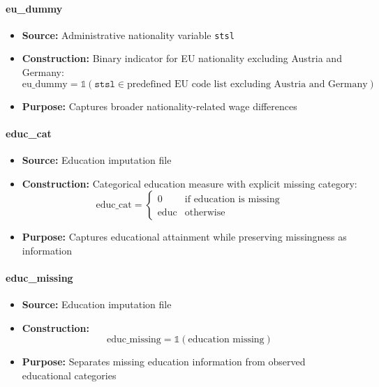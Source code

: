 \documentclass{article}
\begin{document}
\paragraph{eu\_dummy}
\begin{itemize}
    \item \textbf{Source:} Administrative nationality variable \texttt{stsl}
    \item \textbf{Construction:} Binary indicator for EU nationality excluding Austria and Germany:
    \begin{equation}
        \text{eu\_dummy} = \mathbb{1}(\texttt{stsl} \in \text{predefined EU code list excluding Austria and Germany})
    \end{equation}
    \item \textbf{Purpose:} Captures broader nationality-related wage differences
\end{itemize}

\paragraph{educ\_cat}
\begin{itemize}
    \item \textbf{Source:} Education imputation file
    \item \textbf{Construction:} Categorical education measure with explicit missing category:
    \begin{equation}
        \text{educ\_cat} =
        \begin{cases}
            0 & \text{if education is missing}\\
            \text{educ} & \text{otherwise}
        \end{cases}
    \end{equation}
    \item \textbf{Purpose:} Captures educational attainment while preserving missingness as information
\end{itemize}

\paragraph{educ\_missing}
\begin{itemize}
    \item \textbf{Source:} Education imputation file
    \item \textbf{Construction:}
    \begin{equation}
        \text{educ\_missing} = \mathbb{1}(\text{education missing})
    \end{equation}
    \item \textbf{Purpose:} Separates missing education information from observed educational categories
\end{itemize}
\end{document}
